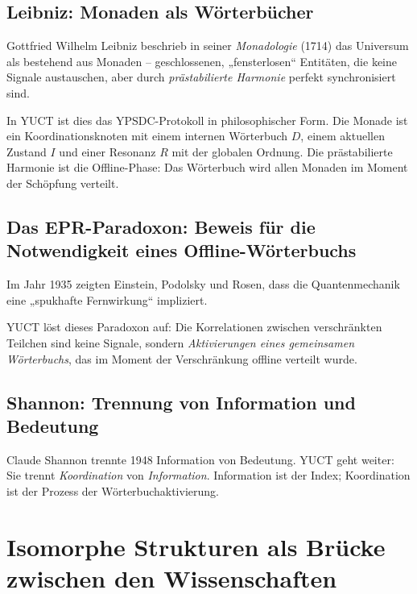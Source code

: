 \documentclass[12pt,a4paper]{article}
\begin{document}
	\subsection{Leibniz: Monaden als Wörterbücher}
	
	Gottfried Wilhelm Leibniz beschrieb in seiner \emph{Monadologie} (1714) das Universum als bestehend aus Monaden – geschlossenen, „fensterlosen“ Entitäten, die keine Signale austauschen, aber durch \emph{prästabilierte Harmonie} perfekt synchronisiert sind.
	
	In YUCT ist dies das YPSDC-Protokoll in philosophischer Form. Die Monade ist ein Koordinationsknoten mit einem internen Wörterbuch \(D\), einem aktuellen Zustand \(I\) und einer Resonanz \(R\) mit der globalen Ordnung. Die prästabilierte Harmonie ist die Offline-Phase: Das Wörterbuch wird allen Monaden im Moment der Schöpfung verteilt.
	
	\subsection{Das EPR-Paradoxon: Beweis für die Notwendigkeit eines Offline-Wörterbuchs}
	
	Im Jahr 1935 zeigten Einstein, Podolsky und Rosen, dass die Quantenmechanik eine „spukhafte Fernwirkung“ impliziert.
	
	YUCT löst dieses Paradoxon auf: Die Korrelationen zwischen verschränkten Teilchen sind keine Signale, sondern \emph{Aktivierungen eines gemeinsamen Wörterbuchs}, das im Moment der Verschränkung offline verteilt wurde.
	
	\subsection{Shannon: Trennung von Information und Bedeutung}
	
	Claude Shannon trennte 1948 Information von Bedeutung. YUCT geht weiter: Sie trennt \emph{Koordination} von \emph{Information}. Information ist der Index; Koordination ist der Prozess der Wörterbuchaktivierung.
	
	\section{Isomorphe Strukturen als Brücke zwischen den Wissenschaften}
	\label{sec:isomorphisms}
	
\end{document}
